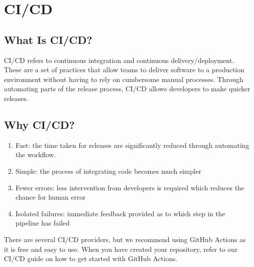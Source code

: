 \documentclass[letterpaper,10pt,english]{jupyterBook}
\begin{document}
\section{CI/CD}
\label{\detokenize{chapter_11/devops:ci-cd}}

\subsection{What Is CI/CD?}
\label{\detokenize{chapter_11/devops:what-is-ci-cd}}
\sphinxAtStartPar
CI/CD refers to continuous integration and continuous
delivery/deployment. These are a set of practices that allow teams to
deliver software to a production environment without having to rely on
cumbersome manual processes. Through automating parts of the release
process, CI/CD allows developers to make quicker releases.


\subsection{Why CI/CD?}
\label{\detokenize{chapter_11/devops:why-ci-cd}}\begin{enumerate}
%
\item {} 
\sphinxAtStartPar
Fast: the time taken for releases are significantly reduced through
automating the workflow.

\item {} 
\sphinxAtStartPar
Simple: the process of integrating code becomes much simpler

\item {} 
\sphinxAtStartPar
Fewer errors: less intervention from developers is required which
reduces the chance for human error

\item {} 
\sphinxAtStartPar
Isolated failures: immediate feedback provided as to which step in
the pipeline has failed

\end{enumerate}

\sphinxAtStartPar
There are several CI/CD providers, but we recommend using GitHub Actions
as it is free and easy to use. When you have created your repository,
refer to our CI/CD guide on how to get started with GitHub Actions.
\end{document}
